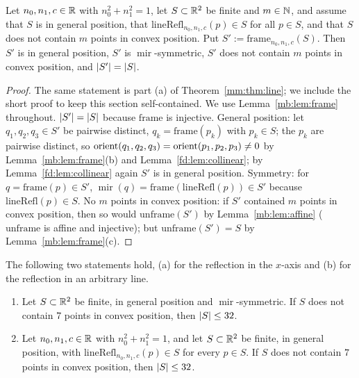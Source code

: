 \begin{lemma}\label{mb:lem:transport}
Let $n_0,n_1,c\in\mathbb R$ with $n_0^2+n_1^2=1$, let $S\subset\mathbb R^2$ be finite and $m\in\mathbb N$, and assume that $S$ is in general
position, that $\mathrm{lineRefl}_{n_0,n_1,c}(p)\in S$ for all $p\in S$, and that $S$ does not contain $m$ points in
convex position. Put $S':=\mathrm{frame}_{n_0,n_1,c}(S)$. Then $S'$ is in general position, $S'$ is
$\operatorname{mir}$-symmetric, $S'$ does not contain $m$ points in convex position, and $\lvert S'\rvert=\lvert S\rvert$.
\end{lemma}

\begin{proof}
The same statement is part (a) of Theorem~\ref{mm:thm:line}; we include the short proof to keep this section
self-contained. We use Lemma~\ref{mb:lem:frame} throughout. $\lvert S'\rvert=\lvert S\rvert$ because $\mathrm{frame}$ is injective. General position:
let $q_1,q_2,q_3\in S'$ be pairwise distinct, $q_k=\mathrm{frame}(p_k)$ with $p_k\in S$; the $p_k$ are pairwise distinct,
so $\operatorname{orient}(q_1,q_2,q_3)=\operatorname{orient}(p_1,p_2,p_3)\ne0$ by Lemma~\ref{mb:lem:frame}(b) and Lemma~\ref{fd:lem:collinear}; by
Lemma~\ref{fd:lem:collinear} again $S'$ is in general position. Symmetry: for $q=\mathrm{frame}(p)\in S'$,
$\operatorname{mir}(q)=\mathrm{frame}(\mathrm{lineRefl}(p))\in S'$ because $\mathrm{lineRefl}(p)\in S$. No $m$ points in
convex position: if $S'$ contained $m$ points in convex position, then so would $\mathrm{unframe}(S')$ by
Lemma~\ref{mb:lem:affine} ($\mathrm{unframe}$ is affine and injective); but $\mathrm{unframe}(S')=S$ by
Lemma~\ref{mb:lem:frame}(c).
\end{proof}

\begin{theorem}\label{mb:thm:seven}
The following two statements hold, (a) for the reflection in the $x$-axis and (b) for the reflection in an arbitrary
line.
\begin{enumerate}[label=(\alph*)]
\item Let $S\subset\mathbb R^2$ be finite, in general position and $\operatorname{mir}$-symmetric. If $S$ does not contain $7$
  points in convex position, then $\lvert S\rvert\le32$.
\item Let $n_0,n_1,c\in\mathbb R$ with $n_0^2+n_1^2=1$, and let $S\subset\mathbb R^2$ be finite, in general position, with
  $\mathrm{lineRefl}_{n_0,n_1,c}(p)\in S$ for every $p\in S$. If $S$ does not contain $7$ points in convex position, then
  $\lvert S\rvert\le32$.
\end{enumerate}
\end{theorem}

